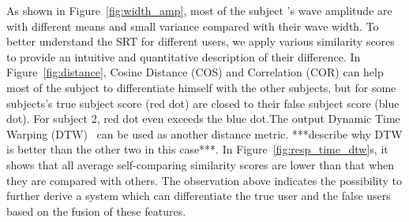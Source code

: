 As shown in Figure~\ref{fig:width_amp}, most of the subject ’s wave amplitude are with different means and small variance compared with their wave width.  To better understand the SRT for different users,  we apply various similarity scores to provide an intuitive and quantitative description of their difference. In Figure~\ref{fig:distance}, Cosine Distance (COS) and Correlation (COR) can help most of the subject to differentiate himself with the other subjects, but for some subjects's true subject score (red dot) are closed to their false subject score (blue dot). For subject 2, red dot even exceeds the blue dot.The output Dynamic Time Warping (DTW)~\cite{cite dtw} can be used as another distance metric. ***describe why DTW is better than the other two in this case***. In Figure~\ref{fig:resp_time_dtw}s,  it shows that all average self-comparing similarity scores are lower than that when they are compared with others. The observation above indicates the possibility to further derive a system which can differentiate the true user and the false users based on the fusion of these features.